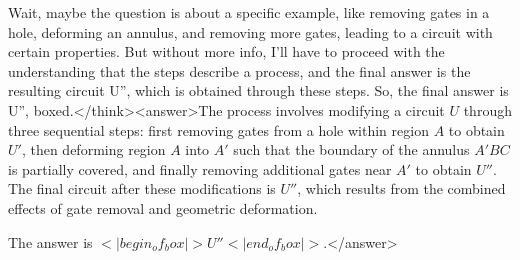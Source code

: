 Wait, maybe the question is about a specific example, like removing gates in a hole, deforming an annulus, and removing more gates, leading to a circuit with certain properties. But without more info, I'll have to proceed with the understanding that the steps describe a process, and the final answer is the resulting circuit U'', which is obtained through these steps. So, the final answer is U'', boxed.</think><answer>The process involves modifying a circuit \( U \) through three sequential steps: first removing gates from a hole within region \( A \) to obtain \( U' \), then deforming region \( A \) into \( A' \) such that the boundary of the annulus \( A'BC \) is partially covered, and finally removing additional gates near \( A' \) to obtain \( U'' \). The final circuit after these modifications is \( U'' \), which results from the combined effects of gate removal and geometric deformation.  

The answer is \(<|begin_of_box|>U''<|end_of_box|>\).</answer>